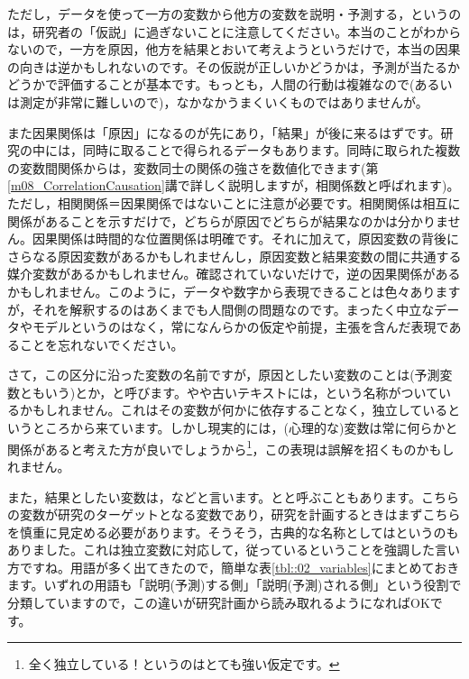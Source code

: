 \documentclass{ltjsbook}
\begin{document}
ただし，データを使って一方の変数から他方の変数を説明・予測する，というのは，研究者の「仮説」に過ぎないことに注意してください。本当のことがわからないので，一方を原因，他方を結果とおいて考えようというだけで，本当の因果の向きは逆かもしれないのです。その仮説が正しいかどうかは，予測が当たるかどうかで評価することが基本です。もっとも，人間の行動は複雑なので(あるいは測定が非常に難しいので)，なかなかうまくいくものではありませんが。

また因果関係は「原因」になるのが先にあり，「結果」が後に来るはずです。研究の中には，同時に取ることで得られるデータもあります。同時に取られた複数の変数間関係からは，変数同士の関係の強さを数値化できます(第\ref{m08_CorrelationCausation}講で詳しく説明しますが，相関係数と呼ばれます)。ただし，相関関係＝因果関係ではないことに注意が必要です。相関関係は相互に関係があることを示すだけで，どちらが原因でどちらが結果なのかは分かりません。因果関係は時間的な位置関係は明確です。それに加えて，原因変数の背後にさらなる原因変数があるかもしれませんし，原因変数と結果変数の間に共通する媒介変数があるかもしれません。確認されていないだけで，逆の因果関係があるかもしれません。このように，データや数字から表現できることは色々ありますが，それを解釈するのはあくまでも人間側の問題なのです。まったく中立なデータやモデルというのはなく，常になんらかの仮定や前提，主張を含んだ表現であることを忘れないでください。


さて，この区分に沿った変数の名前ですが，原因としたい変数のことは(予測変数ともいう)とか，と呼びます。やや古いテキストには，という名称がついているかもしれません。これはその変数が何かに依存することなく，独立しているというところから来ています。しかし現実的には，(心理的な)変数は常に何らかと関係があると考えた方が良いでしょうから\footnote{全く独立している！というのはとても強い仮定です。}，この表現は誤解を招くものかもしれません。

また，結果としたい変数は，などと言います。とと呼ぶこともあります。こちらの変数が研究のターゲットとなる変数であり，研究を計画するときはまずこちらを慎重に見定める必要があります。そうそう，古典的な名称としてはというのもありました。これは独立変数に対応して，従っているということを強調した言い方ですね。用語が多く出てきたので，簡単な表\ref{tbl::02_variables}にまとめておきます。いずれの用語も「説明(予測)する側」「説明(予測)される側」という役割で分類していますので，この違いが研究計画から読み取れるようになればOKです。
\end{document}
